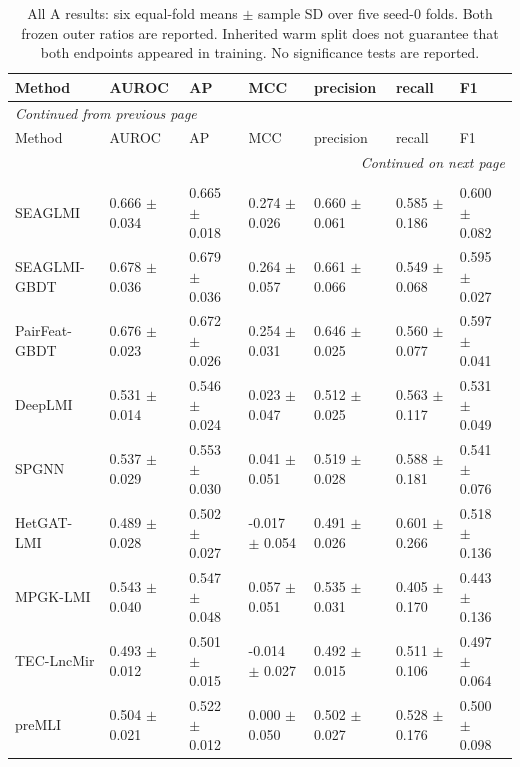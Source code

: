 \begin{landscape}
{\scriptsize
\setlength{\tabcolsep}{4pt}
\renewcommand{\arraystretch}{1.08}
\begin{longtable}{lllllll}
\caption{All A results: six equal-fold means $\pm$ sample SD over five seed-0 folds. Both frozen outer ratios are reported. Inherited warm split does not guarantee that both endpoints appeared in training. No significance tests are reported.}\label{tab:screened-A-full}\\
\toprule
Method & AUROC & AP & MCC & precision & recall & F1 \\
\midrule
\endfirsthead
\multicolumn{7}{l}{\textit{Continued from previous page}}\\
\toprule
Method & AUROC & AP & MCC & precision & recall & F1 \\
\midrule
\endhead
\midrule
\multicolumn{7}{r}{\textit{Continued on next page}}\\
\endfoot
\bottomrule
\endlastfoot
\multicolumn{7}{l}{\textit{Strict | Inherited warm split | outer 1:1}}\\
SEAGLMI & 0.666 $\pm$ 0.034 & 0.665 $\pm$ 0.018 & 0.274 $\pm$ 0.026 & 0.660 $\pm$ 0.061 & 0.585 $\pm$ 0.186 & 0.600 $\pm$ 0.082 \\
SEAGLMI-GBDT & 0.678 $\pm$ 0.036 & 0.679 $\pm$ 0.036 & 0.264 $\pm$ 0.057 & 0.661 $\pm$ 0.066 & 0.549 $\pm$ 0.068 & 0.595 $\pm$ 0.027 \\
PairFeat-GBDT & 0.676 $\pm$ 0.023 & 0.672 $\pm$ 0.026 & 0.254 $\pm$ 0.031 & 0.646 $\pm$ 0.025 & 0.560 $\pm$ 0.077 & 0.597 $\pm$ 0.041 \\
DeepLMI & 0.531 $\pm$ 0.014 & 0.546 $\pm$ 0.024 & 0.023 $\pm$ 0.047 & 0.512 $\pm$ 0.025 & 0.563 $\pm$ 0.117 & 0.531 $\pm$ 0.049 \\
SPGNN & 0.537 $\pm$ 0.029 & 0.553 $\pm$ 0.030 & 0.041 $\pm$ 0.051 & 0.519 $\pm$ 0.028 & 0.588 $\pm$ 0.181 & 0.541 $\pm$ 0.076 \\
HetGAT-LMI & 0.489 $\pm$ 0.028 & 0.502 $\pm$ 0.027 & -0.017 $\pm$ 0.054 & 0.491 $\pm$ 0.026 & 0.601 $\pm$ 0.266 & 0.518 $\pm$ 0.136 \\
MPGK-LMI & 0.543 $\pm$ 0.040 & 0.547 $\pm$ 0.048 & 0.057 $\pm$ 0.051 & 0.535 $\pm$ 0.031 & 0.405 $\pm$ 0.170 & 0.443 $\pm$ 0.136 \\
TEC-LncMir & 0.493 $\pm$ 0.012 & 0.501 $\pm$ 0.015 & -0.014 $\pm$ 0.027 & 0.492 $\pm$ 0.015 & 0.511 $\pm$ 0.106 & 0.497 $\pm$ 0.064 \\
preMLI & 0.504 $\pm$ 0.021 & 0.522 $\pm$ 0.012 & 0.000 $\pm$ 0.050 & 0.502 $\pm$ 0.027 & 0.528 $\pm$ 0.176 & 0.500 $\pm$ 0.098 \\

\end{longtable}}
\end{landscape}
